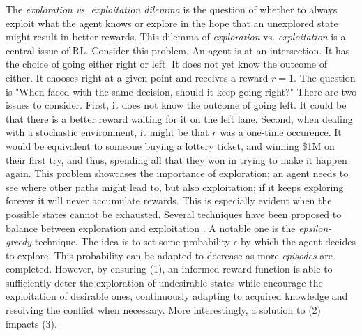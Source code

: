 The \emph{exploration vs. exploitation dilemma} is the question of whether to always exploit what the
agent knows or explore in the hope that an unexplored state might
result in better rewards. This dilemma of \emph{exploration} vs. \emph{exploitation} is a central issue of RL. Consider this problem. An agent is at an intersection. It has the choice of going either right or left. 
It does not yet know the outcome of either. It chooses right at a given point and receives a reward $r=1$. The question is "When faced with the same decision, should it keep going right?" There are two issues to consider. 
First, it does not know the outcome of going left. It could be that there is a better reward waiting for it on the left lane. Second, when dealing with a stochastic environment, it might be that $r$ was a one-time occurence. 
It would be equivalent to someone buying a lottery ticket, and winning
\$1M on their first try, and thus, spending all that they won in trying to make it happen again. This problem showcases the importance of exploration; an agent 
needs to see where other paths might lead to, but also exploitation; if it keeps exploring forever it will never accumulate rewards. This is especially evident when the possible states cannot be exhausted. Several techniques have been proposed 
to balance between exploration and exploitation \cite{Kaelbling1996ReinforcementLA}. A notable one is the \emph{epsilon-greedy} technique. The idea is to set some probability $\epsilon$ by which the agent decides to explore. This probability can be adapted 
to decrease as more \emph{episodes} are completed. However, by ensuring (1), an informed reward function is able to sufficiently 
deter the exploration of undesirable states while encourage the exploitation of desirable ones, continuously adapting to 
acquired knowledge and resolving the conflict when necessary. More interestingly, a solution to (2) impacts (3). 


\medskip

